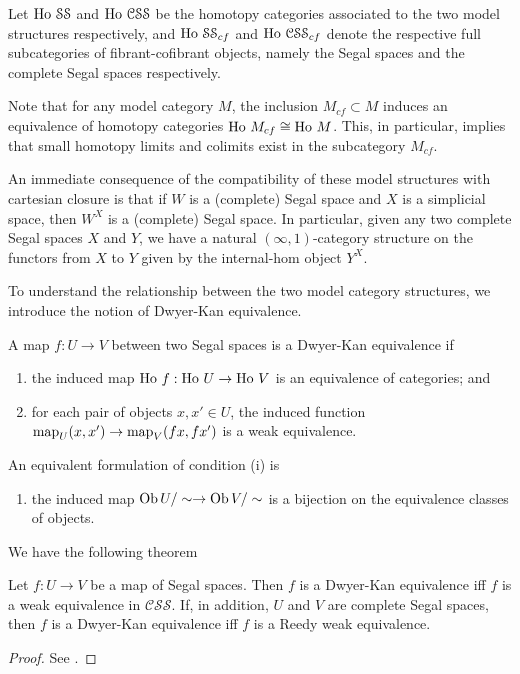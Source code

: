 \begin{refsection}
Let $\operatorname{\mathrm{Ho} \,}\mathcal{SS}$ and $\operatorname{\mathrm{Ho} \,}\mathcal{CSS}$ be the homotopy categories associated to the two model structures respectively, and $\operatorname{\mathrm{Ho} \,}\mathcal{SS}_{cf}$ and $\operatorname{\mathrm{Ho} \,}\mathcal{CSS}_{cf}$ denote the respective full subcategories of fibrant-cofibrant objects, namely the Segal spaces and the complete Segal spaces respectively.

Note that for any model category $M$, the inclusion $M_{cf}\subset M$ induces an equivalence of homotopy categories $\operatorname{\mathrm{Ho} \,} M_{cf}\cong\operatorname{\mathrm{Ho} \,} M$. This, in particular, implies that small homotopy limits and colimits exist in the subcategory $M_{cf}$.

An immediate consequence of the compatibility of these model structures with cartesian closure is that if $W$ is a (complete) Segal space and $X$ is a simplicial space, then $W^X$ is a (complete) Segal space. In particular, given any two complete Segal spaces $X$ and $Y$, we have a natural $(\infty,1)$-category structure on the functors from $X$ to $Y$ given by the internal-hom object $Y^X$.

To understand the relationship between the two model category structures, we introduce the notion of Dwyer-Kan equivalence.
\begin{defin}
A map $f:U\to V$ between two Segal spaces is a Dwyer-Kan equivalence if
\begin{enumerate}
\item the induced map $\operatorname{\mathrm{Ho} \,} f:\operatorname{\mathrm{Ho} \,} U\to\operatorname{\mathrm{Ho} \,} V$ is an equivalence of categories; and
\item for each pair of objects $x,x'\in U$, the induced function $\operatorname{\mathrm{map}}_U(x,x')\to\operatorname{\mathrm{map}}_V(fx,fx')$ is a weak equivalence.
\end{enumerate}
An equivalent formulation of condition (i) is
\begin{enumerate}
\item the induced map $\operatorname{Ob} U/\sim\to\operatorname{Ob} V/\sim$ is a bijection on the equivalence classes of objects.
\end{enumerate}
\end{defin}
We have the following theorem
\begin{thm}\label{thm dk reedy}
Let $f:U\to V$ be a map of Segal spaces. Then $f$ is a Dwyer-Kan equivalence iff $f$ is a weak equivalence in $\mathcal{CSS}$. If, in addition, $U$ and $V$ are complete Segal spaces, then $f$ is a Dwyer-Kan equivalence iff $f$ is a Reedy weak equivalence.
\end{thm}
\begin{proof}
See \cite[Thm 7.7]{rezk}.
\end{proof}


\end{refsection}

